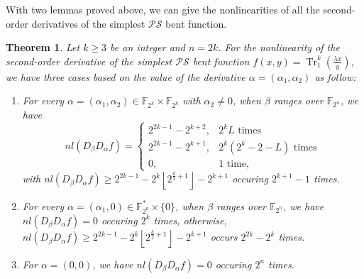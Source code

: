 \documentclass{article}
\newcommand{\F}{\mathbb{F}}
\newcommand{\0}{\textbf{0}}
\newcommand{\1}{\textbf{1}}
\newcommand{\TRACE}{\operatorname{Tr}_1^k}
\theoremstyle{plain}
\newtheorem{theorem}{Theorem}
\begin{document}
    With two lemmas proved above, we can give the nonlinearities of all the second-order derivatives of the simplest $ \mathcal{PS} $ bent function.
    \begin{theorem}\label{thm:nl_DaDbf}
        Let $ k\ge 3 $ be an integer and $ n=2k $. 
        For the nonlinearity of the second-order derivative of 
        the simplest $ \mathcal{PS} $ bent function $ f(x,y)=\TRACE(\frac{\lambda x}{y}) $, 
        we have three cases based on the value of the derivative $ \alpha=(\alpha_1,\alpha_2) $ as follow: 
        \begin{enumerate}[label=(\arabic{*})]
            \item For every $ \alpha=(\alpha_1,\alpha_2)\in\F_{2^k}\times\F_{2^k} $ with $ \alpha_2\ne 0 $, 
            when $ \beta $ ranges over $ \F_{2^n} $, we have 
            \begin{equation}\label{res:nontrivil_nl}
                nl(D_{\beta}D_{\alpha}f)=\begin{cases}
                    2^{2k-1}-2^{k+2},&2^kL\text{~times}\\
                    2^{2k-1}-2^{k+1},&2^k(2^k-2-L)\text{~times}\\
                    0,&1\text{~time},%
                \end{cases}
            \end{equation}
            with $ nl(D_{\beta}D_{\alpha}f)\ge 2^{2k-1}-2^k\left\lfloor 2^{\frac{k}{2}+1}\right\rfloor-2^{k+1} $ occuring $ 2^{k+1}-1 $ times.
            \item For every $ \alpha=(\alpha_1,0)\in\F_{2^k}^*\times\{0\} $, when $ \beta $ ranges over $ \F_{2^n} $, 
            we have $ nl(D_{\beta}D_{\alpha}f)=0 $ occuring $ 2^k $ times,  
            otherwise, $ nl(D_{\beta}D_{\alpha}f)\ge 2^{2k-1}-2^k\left\lfloor 2^{\frac{k}{2}+1}\right\rfloor-2^{k+1} $ occurs $ 2^{2k}-2^k $ times. 
            \item For $ \alpha=(0,0) $, we have $ nl(D_{\beta}D_{\alpha}f) = 0 $ occuring $ 2^n $ times.
        \end{enumerate} 
    \end{theorem}
\end{document}
